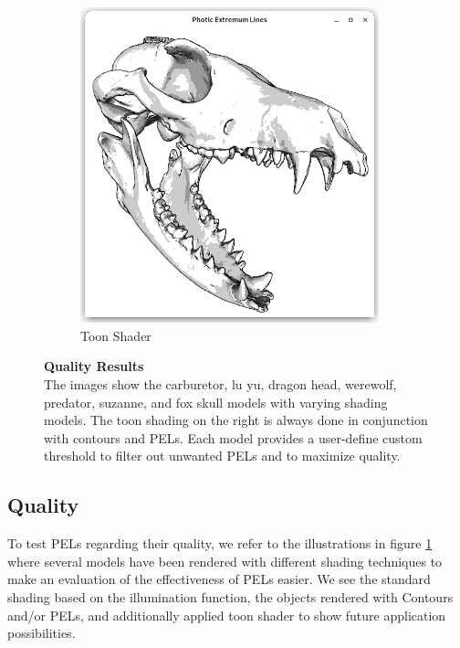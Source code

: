 \documentclass[9pt,fleqn,twoside,twocolumn]{stdglobal}
\begin{document}
\begin{figure}
\begin{subfigure}[t]{0.19\textwidth}
        \includegraphics[width=0.95\textwidth,trim={15px 15 15 50},clip]{images/results/skull-contours-pel-toon.png}
        \caption{Toon Shader}
      \end{subfigure}%
      \caption{%
        \textbf{Quality Results}\\
        The images show the carburetor, lu yu, dragon head, werewolf, predator, suzanne, and fox skull models with varying shading models.
        The toon shading on the right is always done in conjunction with contours and PELs.
        Each model provides a user-define custom threshold to filter out unwanted PELs and to maximize quality.
      }
      \label{fig:quality-results}
    \end{figure}


  \subsection{Quality}
    To test PELs regarding their quality, we refer to the illustrations in figure \ref{fig:quality-results} where several models have been rendered with different shading techniques to make an evaluation of the effectiveness of PELs easier.
    We see the standard shading based on the illumination function, the objects rendered with Contours and/or PELs, and additionally applied toon shader to show future application possibilities.
\end{document}
